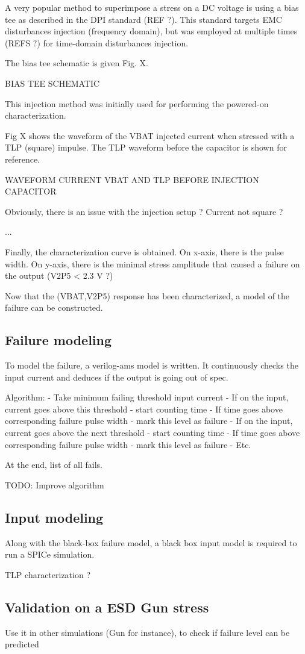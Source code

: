 A very popular method to superimpose a stress on a DC voltage is using a bias tee as described in the DPI standard (REF ?).
This standard targets EMC disturbances injection (frequency domain),
but was employed at multiple times (REFS ?) for time-domain disturbances injection.

The bias tee schematic is given Fig. X.

BIAS TEE SCHEMATIC

This injection method was initially used for performing the powered-on characterization.

Fig X shows the waveform of the VBAT injected current when stressed with a TLP (square) impulse.
The TLP waveform before the capacitor is shown for reference.

WAVEFORM CURRENT VBAT AND TLP BEFORE INJECTION CAPACITOR

Obviously, there is an issue with the injection setup ? Current not square ?

...

Finally, the characterization curve is obtained.
On x-axis, there is the pulse width.
On y-axis, there is the minimal stress amplitude that caused a failure on the output (V2P5 < 2.3 V ?)

Now that the (VBAT,V2P5) response has been characterized, a model of the failure can be constructed.

\subsection{Failure modeling}

To model the failure, a verilog-ams model is written.
It continuously checks the input current and deduces if the output is going out of spec.

Algorithm:
- Take minimum failing threshold input current
- If on the input, current goes above this threshold
  - start counting time
  - If time goes above corresponding failure pulse width
    - mark this level as failure
  - If on the input, current goes above the next threshold
    - start counting time
    - If time goes above corresponding failure pulse width
      - mark this level as failure
    - Etc.

At the end, list of all fails.

TODO: Improve algorithm

\subsection{Input modeling}

Along with the black-box failure model, a black box input model is required to run a SPICe simulation.

TLP characterization ?

\subsection{Validation on a ESD Gun stress}
Use it in other simulations (Gun for instance), to check if failure level can be predicted
